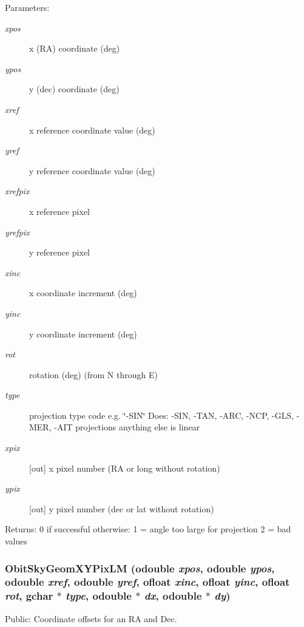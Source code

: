 \begin{Desc}
\item[Parameters:]
\begin{description}
\item[{\em xpos}]x (RA) coordinate (deg) \item[{\em ypos}]y (dec) coordinate (deg) \item[{\em xref}]x reference coordinate value (deg) \item[{\em yref}]y reference coordinate value (deg) \item[{\em xrefpix}]x reference pixel \item[{\em yrefpix}]y reference pixel \item[{\em xinc}]x coordinate increment (deg) \item[{\em yinc}]y coordinate increment (deg) \item[{\em rot}]rotation (deg) (from N through E) \item[{\em type}]projection type code e.g. \char`\"{}-SIN\char`\"{} Does: -SIN, -TAN, -ARC, -NCP, -GLS, -MER, -AIT projections anything else is linear \item[{\em xpix}][out] x pixel number (RA or long without rotation) \item[{\em ypix}][out] y pixel number (dec or lat without rotation) \end{description}
\end{Desc}
\begin{Desc}
\item[Returns:]0 if successful otherwise: 1 = angle too large for projection 2 = bad values \end{Desc}
\subsubsection{ Obit\-Sky\-Geom\-XYPix\-LM ({\bf odouble} {\em xpos}, {\bf odouble} {\em ypos}, {\bf odouble} {\em xref}, {\bf odouble} {\em yref}, {\bf ofloat} {\em xinc}, {\bf ofloat} {\em yinc}, {\bf ofloat} {\em rot}, gchar $\ast$ {\em type}, {\bf odouble} $\ast$ {\em dx}, {\bf odouble} $\ast$ {\em dy})}\label{ObitSkyGeom_8h_a18}


Public: Coordinate offsets for an RA and Dec. 

